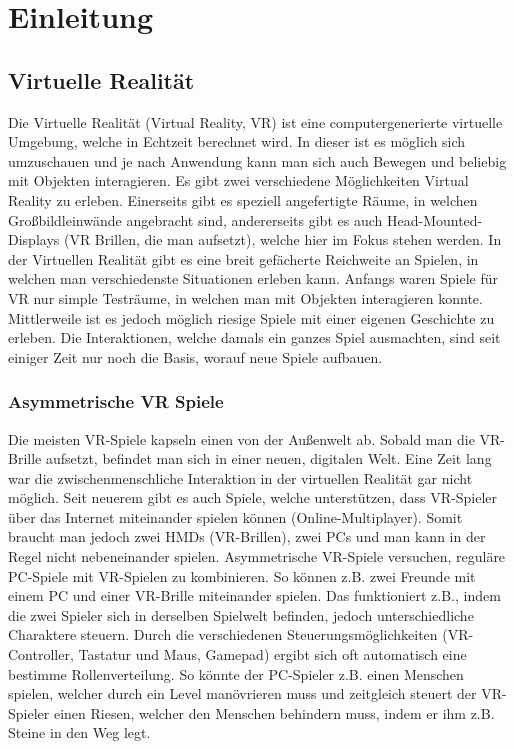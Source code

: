 \chapter{Einleitung}
\label{cha:sa_Einleitung}

\section{Virtuelle Realität}
Die Virtuelle Realität (Virtual Reality, VR) ist eine computergenerierte virtuelle Umgebung, welche in Echtzeit berechnet wird. In dieser ist es möglich sich umzuschauen und je nach Anwendung kann man sich auch Bewegen und beliebig mit Objekten interagieren. Es gibt zwei verschiedene Möglichkeiten Virtual Reality zu erleben. Einerseits gibt es speziell angefertigte Räume, in welchen Großbildleinwände angebracht sind, andererseits gibt es auch Head-Mounted-Displays (VR Brillen, die man aufsetzt), welche hier im Fokus stehen werden. In der Virtuellen Realität gibt es eine breit gefächerte Reichweite an Spielen, in welchen man verschiedenste Situationen erleben kann. Anfangs waren Spiele für VR nur simple Testräume, in welchen man mit Objekten interagieren konnte. Mittlerweile ist es jedoch möglich riesige Spiele mit einer eigenen Geschichte zu erleben. Die Interaktionen, welche damals ein ganzes Spiel ausmachten, sind seit einiger Zeit nur noch die Basis, worauf neue Spiele aufbauen.

\subsection{Asymmetrische VR Spiele}
Die meisten VR-Spiele kapseln einen von der Außenwelt ab. Sobald man die VR-Brille aufsetzt, befindet man sich in einer neuen, digitalen Welt. Eine Zeit lang war die zwischenmenschliche Interaktion in der virtuellen Realität gar nicht möglich. Seit neuerem gibt es auch Spiele, welche unterstützen, dass VR-Spieler über das Internet miteinander spielen können (Online-Multiplayer). Somit braucht man jedoch zwei HMDs (VR-Brillen), zwei PCs und man kann in der Regel nicht nebeneinander spielen. Asymmetrische VR-Spiele versuchen, reguläre PC-Spiele mit VR-Spielen zu kombinieren. So können z.B. zwei Freunde mit einem PC und einer VR-Brille miteinander spielen. Das funktioniert z.B., indem die zwei Spieler sich in derselben Spielwelt befinden, jedoch unterschiedliche Charaktere steuern. Durch die verschiedenen Steuerungsmöglichkeiten (VR-Controller, Tastatur und Maus, Gamepad) ergibt sich oft automatisch eine bestimme Rollenverteilung. So könnte der PC-Spieler z.B. einen Menschen spielen, welcher durch ein Level manövrieren muss und zeitgleich steuert der VR-Spieler einen Riesen, welcher den Menschen behindern muss, indem er ihm z.B. Steine in den Weg legt.

